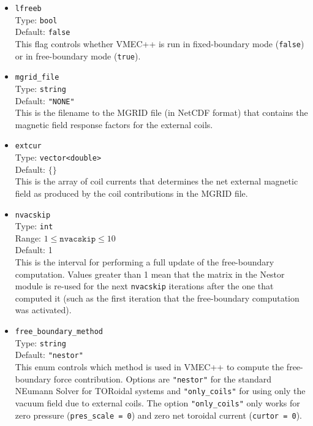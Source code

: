 \begin{itemize}

 \item \texttt{lfreeb} \\
       Type: \texttt{bool} \\
       Default: \texttt{false} \\
       This flag controls whether VMEC++ is run in fixed-boundary mode (\texttt{false}) or in free-boundary mode (\texttt{true}).

 \item \texttt{mgrid\_file} \\
       Type: \texttt{string} \\
       Default: \texttt{"NONE"} \\
       This is the filename to the MGRID file (in NetCDF format) that contains the magnetic field response factors for the external coils.

 \item \texttt{extcur} \\
       Type: \texttt{vector<double>} \\
       Default: $\{ \}$ \\
       This is the array of coil currents that determines the net external magnetic field as produced by the coil contributions in the MGRID file.

 \item \texttt{nvacskip} \\
       Type: \texttt{int} \\
       Range: $1 \leq \texttt{nvacskip} \leq 10$ \\
       Default: 1 \\
       This is the interval for performing a full update of the free-boundary computation.
       Values greater than 1 mean that the matrix in the Nestor module is re-used for the next \texttt{nvacskip} iterations
       after the one that computed it (such as the first iteration that the free-boundary computation was activated).

 \item \texttt{free\_boundary\_method} \\
       Type: \texttt{string} \\
       Default: \texttt{"nestor"} \\
       This enum controls which method is used in VMEC++
       to compute the free-boundary force contribution.
       Options are \texttt{"nestor"} for the standard
       NEumann Solver for TORoidal systems
       and \texttt{"only\_coils"} for using only the vacuum field due to external coils.
       The option \texttt{"only\_coils"} only works for zero pressure (\texttt{pres\_scale = 0})
       and zero net toroidal current (\texttt{curtor = 0}).

\end{itemize}

